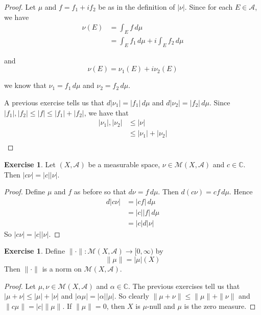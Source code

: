 \documentclass[12pt]{amsart}
\theoremstyle{definition}
\newtheorem{ex}[definition]{Exercise}
\newcommand{\al}{\alpha}
\newcommand{\C}{\mathbb{C}}
\newcommand{\MA}{\mathcal{A}}
\newcommand{\MM}{\mathcal{M}}
\newcommand{\dmu}{\, d \mu}
\newcommand{\Rg}{[0,\infty)}
\newcommand{\lex}[1]{\label{ex:#1}}
\begin{document}
	\begin{proof}
		Let $\mu$ and $f = f_1 + i f_2$ be as in the definition of $|\nu|$. Since for each $E \in \MA$, we have 
		\begin{align*}
			\nu(E) 
			&= \int_E f \dmu\\
			&= \int_E f_1 \dmu + i \int_E f_2 \dmu
		\end{align*}
		
		and $$\nu(E) = \nu_1(E) + i\nu_2(E)$$
		
		we know that $\nu_1 = f_1 \dmu$ and $\nu_2 = f_2 \dmu$. 
		
		A previous exercise tells us that $d|\nu_1| = |f_1|\dmu$ and $d |\nu_2| = |f_2|\dmu$. Since $|f_1|, |f_2| \leq |f| \leq |f_1|+|f_2|$, we have that 
		\begin{align*}
			|\nu_1|, |\nu_2| 
			&\leq |\nu| \\
			&\leq |\nu_1| + |\nu_2|\\
		\end{align*}
	\end{proof}
	
	\begin{ex} \lex{43007} 
		Let  $(X, \MA)$ be a measurable space, $\nu \in \MM(X, \MA)$ and $c \in \C$. Then $| c \nu | = | c | | \nu |$.
	\end{ex}
	
	\begin{proof}
		Define $\mu$ and $f$ as before so that $d \nu = f \dmu$. Then $d (c \nu) = c f \dmu$. Hence 
		\begin{align*}
			d | c \nu | 
			&= | cf | \dmu \\
			&= | c | | f | \dmu\\
			&= | c | d| \nu |
		\end{align*}
		So $| c \nu | = | c | |  \nu |$.
	\end{proof}

	\begin{ex} \lex{43008} 
	Define $\|\cdot \|: \MM(X, \MA) \rightarrow \Rg$ by $$\|\mu \|= | \mu | (X)$$ 
	Then $\|\cdot \|$ is a norm on $\MM(X, \MA)$. 
	\end{ex}
	
	\begin{proof}
		Let $\mu, \nu \in \MM(X, \MA)$ and $\al \in \C$. The previous exercises tell us that $| \mu + \nu | \leq | \mu | + | \nu |$ and $| \al \mu | = | \al | | \mu |$. So clearly $\|\mu + \nu \|\leq \|\mu \|+ \|\nu \|$ and $\|c \mu \|= | c | \|\mu \|$. If $\|\mu \|= 0$, then $X$ is $\mu$-null and $\mu$ is the zero measure.
	\end{proof}
	
\end{document}
